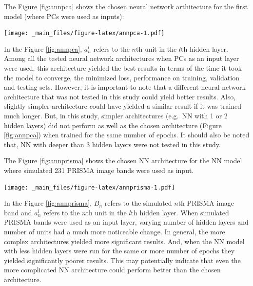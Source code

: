\documentclass[a4paper, twoside]{templates/ociamthesis}
\let\origfigure\figure
\let\endorigfigure\endfigure
\renewenvironment{figure}[1][2] {
    \expandafter\origfigure\expandafter[H]
} {
    \endorigfigure
}
\begin{document}
The Figure \ref{fig:annpca} shows the chosen neural network arthitecture for the first model (where PCs were used as inputs):

\begin{figure}
\centering
\texttt{[image: \_main\_files/figure-latex/annpca-1.pdf]}
\caption{\label{fig:annpca}Architecture of the Neural Network with Principal Components as inputs}
\end{figure}

In the Figure \ref{fig:annpca}, \(a_{n}^{l}\) refers to the \(n\)th unit in the \(l\)th hidden layer. Among all the tested neural network architectures when PCs as an input layer were used, this architecture yielded the best results in terms of the time it took the model to converge, the minimized loss, performance on training, validation and testing sets. However, it is important to note that a different neural network architecture that was not tested in this study could yield better results. Also, slightly simpler architecture could have yielded a similar result if it was trained much longer. But, in this study, simpler architectures (e.g.~NN with 1 or 2 hidden layers) did not perform as well as the chosen architecture (Figure \ref{fig:annpca}) when trained for the same number of epochs. It should also be noted that, NN with deeper than 3 hidden layers were not tested in this study.

The Figure \ref{fig:annprisma} shows the chosen NN architecture for the NN model where simulated 231 PRISMA image bands were used as input.

\newpage

\begin{figure}
\centering
\texttt{[image: \_main\_files/figure-latex/annprisma-1.pdf]}
\caption{\label{fig:annprisma}Architecture of the Neural Network with simulated PRISMA image bands as inputs}
\end{figure}

In the Figure \ref{fig:annprisma}, \(B_{n}\) refers to the simulated \(n\)th PRISMA image band and \(a_{n}^{l}\) refers to the \(n\)th unit in the \(l\)th hidden layer. When simulated PRISMA bands were used as an input layer, varying number of hidden layers and number of units had a much more noticeable change. In general, the more complex architectures yielded more significant results. And, when the NN model with less hidden layers were run for the same or more number of epochs they yielded significantly poorer results. This may potentially indicate that even the more complicated NN architecture could perform better than the chosen architecture.
\end{document}

